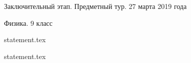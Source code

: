 \documentclass[a4paper,11pt, oneside]{book}
\begin{document}
\vspace{-3mm}
\vspace{-5mm}

\normalsize

\begin{center}
    Заключительный этап. Предметный тур. 27 марта 2019 года
    
    Физика. 9 класс
\end{center}

\parindent=0cm

{statement.tex}

\newpage

{statement.tex}
\end{document}
